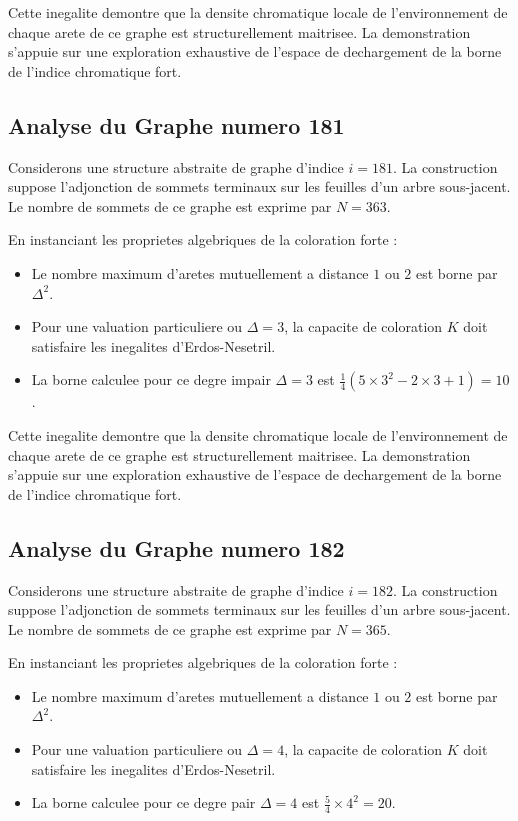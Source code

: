 \documentclass[11pt,a4paper]{article}
\begin{document}
Cette inegalite demontre que la densite chromatique locale de l'environnement de chaque arete de ce graphe est structurellement maitrisee. La demonstration s'appuie sur une exploration exhaustive de l'espace de dechargement de la borne de l'indice chromatique fort.

\subsection{Analyse du Graphe numero 181}
Considerons une structure abstraite de graphe d'indice $i = 181$. La construction suppose l'adjonction de sommets terminaux sur les feuilles d'un arbre sous-jacent. Le nombre de sommets de ce graphe est exprime par $N = 363$.

En instanciant les proprietes algebriques de la coloration forte :
\begin{itemize}
\item Le nombre maximum d'aretes mutuellement a distance $1$ ou $2$ est borne par $\Delta^2$.
\item Pour une valuation particuliere ou $\Delta = 3$, la capacite de coloration $K$ doit satisfaire les inegalites d'Erdos-Nesetril.
\item La borne calculee pour ce degre impair $\Delta = 3$ est $\frac{1}{4}(5 \times 3^2 - 2 \times 3 + 1) = 10$.
\end{itemize}

Cette inegalite demontre que la densite chromatique locale de l'environnement de chaque arete de ce graphe est structurellement maitrisee. La demonstration s'appuie sur une exploration exhaustive de l'espace de dechargement de la borne de l'indice chromatique fort.

\subsection{Analyse du Graphe numero 182}
Considerons une structure abstraite de graphe d'indice $i = 182$. La construction suppose l'adjonction de sommets terminaux sur les feuilles d'un arbre sous-jacent. Le nombre de sommets de ce graphe est exprime par $N = 365$.

En instanciant les proprietes algebriques de la coloration forte :
\begin{itemize}
\item Le nombre maximum d'aretes mutuellement a distance $1$ ou $2$ est borne par $\Delta^2$.
\item Pour une valuation particuliere ou $\Delta = 4$, la capacite de coloration $K$ doit satisfaire les inegalites d'Erdos-Nesetril.
\item La borne calculee pour ce degre pair $\Delta = 4$ est $\frac{5}{4} \times 4^2 = 20$.
\end{itemize}
\end{document}
